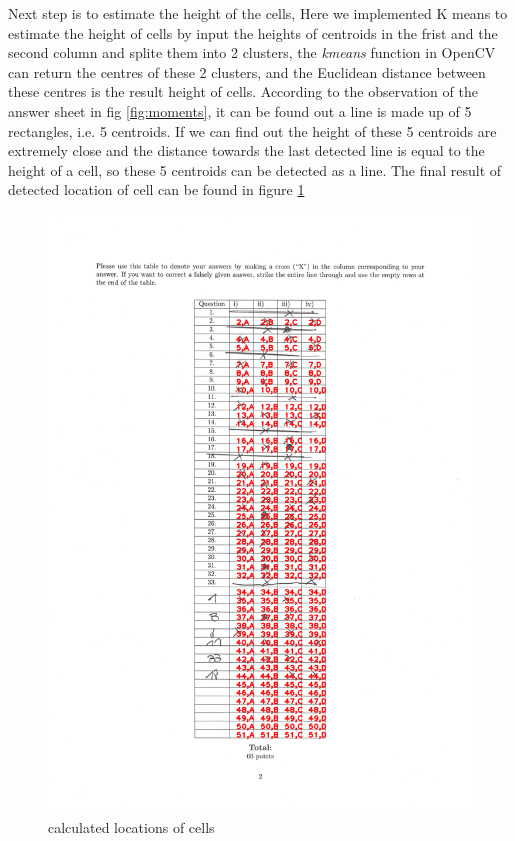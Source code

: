 \documentclass[a4paper,twoside]{article}
\begin{document}
Next step is to estimate the height of the cells, Here we implemented K means to estimate the height of cells by input the heights of centroids in the frist and the second column and splite them into 2 clusters, the \textit{kmeans} function in OpenCV can return the centres of these 2 clusters, and the Euclidean distance between these centres is the result height of cells.
According to the observation of the answer sheet in fig \ref{fig:moments}, it can be found out a line is made up of 5 rectangles, i.e. 5 centroids. If we can find out the height of these 5 centroids are extremely close and the distance towards the last detected line is equal to the height of a cell, so these 5 centroids can be detected as a line. The final result of detected location of cell can be found in figure \ref{fig:locations of cells}
\begin{figure}[!h]
  \centering
  \includegraphics[width=\columnwidth]{Latex/imgs/celldetection.png}
  \caption{calculated locations of cells}
  \label{fig:locations of cells}
 \end{figure}
\end{document}

